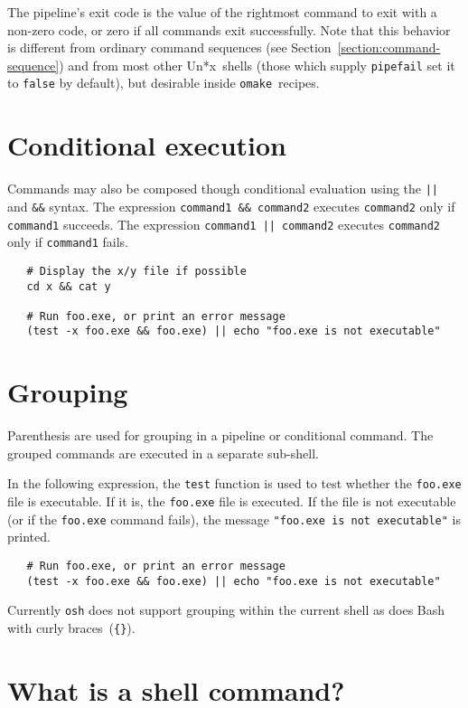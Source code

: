 The pipeline's exit code is the value of the rightmost command to exit with a non-zero code, or zero
if all commands exit successfully.  Note that this behavior is different from ordinary command
sequences (see Section~\ref{section:command-sequence}) and from most other Un*x~shells (those which
supply \verb+pipefail+ set it to \verb+false+ by default), but desirable inside
\verb+omake+~recipes.

\section{Conditional execution}

Commands may also be composed though conditional evaluation using the \verb+||+ and \verb+&&+
syntax.  The expression \verb+command1 && command2+ executes \verb+command2+ only if \verb+command1+
succeeds.  The expression \verb+command1 || command2+ executes \verb+command2+ only if
\verb+command1+ fails.

\begin{verbatim}
   # Display the x/y file if possible
   cd x && cat y

   # Run foo.exe, or print an error message
   (test -x foo.exe && foo.exe) || echo "foo.exe is not executable"
\end{verbatim}

\section{Grouping}

Parenthesis are used for grouping in a pipeline or conditional command.  The grouped commands are
executed in a separate sub-shell.

In the following expression, the \verb+test+ function is used to test whether the \verb+foo.exe+
file is executable.  If it is, the \verb+foo.exe+ file is executed.  If the file is not executable
(or if the \verb+foo.exe+ command fails), the message \verb+"foo.exe is not executable"+ is printed.

\begin{verbatim}
   # Run foo.exe, or print an error message
   (test -x foo.exe && foo.exe) || echo "foo.exe is not executable"
\end{verbatim}

Currently \verb+osh+ does not support grouping within the current shell as does Bash with curly
braces~(\verb+{}+).

\section{What is a shell command?}

